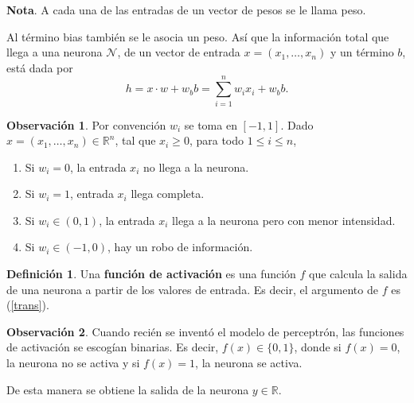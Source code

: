 \documentclass[11pt,letterpaper]{article}
\theoremstyle{definition}
\newtheorem{defi}{Definición}[section]%
\theoremstyle{definition}
\theoremstyle{definition}
\theoremstyle{definition}
\newtheorem{obs}{Observación}
\theoremstyle{definition}
\theoremstyle{definition}
\theoremstyle{definition}
\theoremstyle{definition}
\begin{document}
\textbf{Nota}. A cada una de las entradas de un vector de pesos se le llama peso.

Al término bias también se le asocia un peso. Así que la información total que llega a una neurona $ \mathcal{N} $, de un vector de entrada $ x=(x_1, \dots, x_n) $ y un término $ b $, está dada por
\begin{equation}\label{trans}
	h=x\cdot w+w_b b=\sum_{i=1}^{n} w_i x_i+w_b b.
\end{equation}

\begin{obs}
	Por convención $ w_i $ se toma en $ [-1,1] $. Dado $ x=(x_1,\dots, x_n)\in\mathbb{R}^{n} $, tal que $ x_i\geq0 $, para todo $ 1\leq i \leq n $,
	\begin{enumerate}
		\item Si $ w_i=0 $, la entrada $ x_i $ no llega a la neurona.
		\item Si $ w_i=1 $, entrada $ x_i $ llega completa.
		\item Si $ w_i\in (0,1) $, la entrada $ x_i $ llega a la neurona pero con menor intensidad.
		\item Si $ w_i\in (-1,0) $, hay un robo de información.
	\end{enumerate}
\end{obs}

\begin{defi}
	Una \textbf{función de activación} es una función $ f $ que calcula la salida de una neurona a partir de los valores de entrada. Es decir, el argumento de $ f $ es (\ref{trans}). 
\end{defi}

\begin{obs}
	Cuando recién se inventó el modelo de perceptrón, las funciones de activación se escogían binarias. Es decir, $ f(x)\in\{0,1\} $, donde si $ f(x)=0 $, la neurona no se activa y si $ f(x)=1 $, la neurona se activa.
\end{obs}

De esta manera se obtiene la salida de la neurona $ y\in\mathbb{R} $. 
\end{document}
